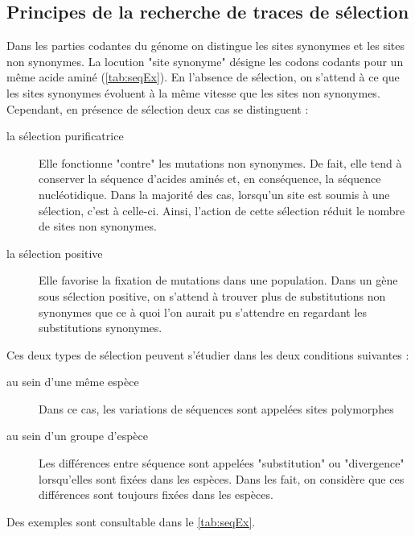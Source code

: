 \documentclass[../main]{subfiles} %
\begin{document}
\subsection{Principes de la recherche de traces de sélection}
\label{PrincipeTrace}

Dans les parties codantes du génome on distingue les sites \glspl{synonyme} et les sites non \glspl{synonyme}. La locution "site \gls{synonyme}" désigne les codons codants pour un même acide aminé (\cref{tab:seqEx}). En l'absence de sélection, on s'attend à ce que les sites \glspl{synonyme} évoluent à la même vitesse que les sites non \glspl{synonyme}. Cependant, en présence de sélection deux cas se distinguent :
\begin{description}

    \item [la sélection purificatrice] Elle fonctionne "contre" les mutations non \glspl{synonyme}. De fait, elle tend à conserver la séquence d'acides aminés et, en conséquence, la séquence nucléotidique. Dans la majorité des cas, lorsqu'un site est soumis à une sélection, c'est à celle-ci. Ainsi, l'action de cette sélection réduit le nombre de sites non \glspl{synonyme}.

    \item [la sélection positive] Elle favorise la fixation de mutations dans une population. Dans un gène sous sélection positive, on s'attend à trouver plus de substitutions non \glspl{synonyme} que ce à quoi l'on aurait pu s'attendre en regardant les substitutions \glspl{synonyme}.
    
\end{description}

Ces deux types de sélection peuvent s'étudier dans les deux conditions suivantes :
\begin{description}
    \item [au sein d’une même espèce] Dans ce cas, les variations de séquences sont appelées sites polymorphes
    \item [au sein d'un groupe d'espèce] Les différences entre séquence sont appelées "\gls{substitution}" ou "divergence" lorsqu'elles sont fixées dans les espèces. Dans les fait, on  considère que ces différences sont toujours fixées dans les espèces.
\end{description}
Des exemples sont consultable dans le \cref{tab:seqEx}.
\end{document}

